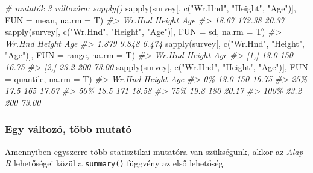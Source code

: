 \documentclass[
]{book}
\newenvironment{Shaded}{\begin{snugshade}}{\end{snugshade}}
\newcommand{\AttributeTok}[1]{\textcolor[rgb]{0.77,0.63,0.00}{#1}}
\newcommand{\CommentTok}[1]{\textcolor[rgb]{0.56,0.35,0.01}{\textit{#1}}}
\newcommand{\FunctionTok}[1]{\textcolor[rgb]{0.00,0.00,0.00}{#1}}
\newcommand{\NormalTok}[1]{#1}
\newcommand{\StringTok}[1]{\textcolor[rgb]{0.31,0.60,0.02}{#1}}
\begin{document}
\begin{Shaded}
\begin{Highlighting}[]
\CommentTok{\# mutatók 3 változóra: sapply()}
\FunctionTok{sapply}\NormalTok{(survey[, }\FunctionTok{c}\NormalTok{(}\StringTok{"Wr.Hnd"}\NormalTok{, }\StringTok{"Height"}\NormalTok{, }\StringTok{"Age"}\NormalTok{)], }\AttributeTok{FUN =}\NormalTok{ mean, }\AttributeTok{na.rm =}\NormalTok{ T)}
\CommentTok{\#\textgreater{} Wr.Hnd Height    Age }
\CommentTok{\#\textgreater{}  18.67 172.38  20.37}
\FunctionTok{sapply}\NormalTok{(survey[, }\FunctionTok{c}\NormalTok{(}\StringTok{"Wr.Hnd"}\NormalTok{, }\StringTok{"Height"}\NormalTok{, }\StringTok{"Age"}\NormalTok{)], }\AttributeTok{FUN =}\NormalTok{ sd, }\AttributeTok{na.rm =}\NormalTok{ T)}
\CommentTok{\#\textgreater{} Wr.Hnd Height    Age }
\CommentTok{\#\textgreater{}  1.879  9.848  6.474}
\FunctionTok{sapply}\NormalTok{(survey[, }\FunctionTok{c}\NormalTok{(}\StringTok{"Wr.Hnd"}\NormalTok{, }\StringTok{"Height"}\NormalTok{, }\StringTok{"Age"}\NormalTok{)], }\AttributeTok{FUN =}\NormalTok{ range, }\AttributeTok{na.rm =}\NormalTok{ T)}
\CommentTok{\#\textgreater{}      Wr.Hnd Height   Age}
\CommentTok{\#\textgreater{} [1,]   13.0    150 16.75}
\CommentTok{\#\textgreater{} [2,]   23.2    200 73.00}
\FunctionTok{sapply}\NormalTok{(survey[, }\FunctionTok{c}\NormalTok{(}\StringTok{"Wr.Hnd"}\NormalTok{, }\StringTok{"Height"}\NormalTok{, }\StringTok{"Age"}\NormalTok{)], }\AttributeTok{FUN =}\NormalTok{ quantile, }\AttributeTok{na.rm =}\NormalTok{ T)}
\CommentTok{\#\textgreater{}      Wr.Hnd Height   Age}
\CommentTok{\#\textgreater{} 0\%     13.0    150 16.75}
\CommentTok{\#\textgreater{} 25\%    17.5    165 17.67}
\CommentTok{\#\textgreater{} 50\%    18.5    171 18.58}
\CommentTok{\#\textgreater{} 75\%    19.8    180 20.17}
\CommentTok{\#\textgreater{} 100\%   23.2    200 73.00}
\end{Highlighting}
\end{Shaded}

\hypertarget{egy-vuxe1ltozuxf3-tuxf6bb-mutatuxf3}{%
\subsubsection{Egy változó, több mutató}\label{egy-vuxe1ltozuxf3-tuxf6bb-mutatuxf3}}

Amennyiben egyszerre több statisztikai mutatóra van szükségünk, akkor az \emph{Alap R} lehetőségei közül a \texttt{summary()} függvény az első lehetőség.
\end{document}
